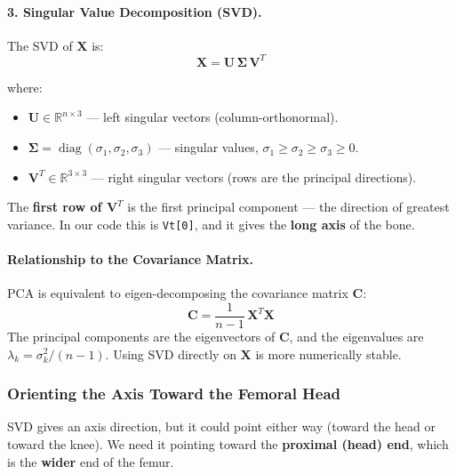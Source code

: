 \documentclass[12pt,a4paper]{article}
\begin{document}
\paragraph{3. Singular Value Decomposition (SVD).}
The SVD of $\mathbf{X}$ is:
\begin{equation}
    \boxed{
        \mathbf{X} = \mathbf{U} \, \boldsymbol{\Sigma} \, \mathbf{V}^T
    }
    \label{eq:svd}
\end{equation}

where:
\begin{itemize}
    \item $\mathbf{U} \in \mathbb{R}^{n \times 3}$ — left singular vectors
          (column-orthonormal).
    \item $\boldsymbol{\Sigma} = \operatorname{diag}(\sigma_1, \sigma_2, \sigma_3)$
          — singular values, $\sigma_1 \geq \sigma_2 \geq \sigma_3 \geq 0$.
    \item $\mathbf{V}^T \in \mathbb{R}^{3 \times 3}$ — right singular vectors
          (rows are the principal directions).
\end{itemize}

The \textbf{first row of $\mathbf{V}^T$} is the first principal component —
the direction of greatest variance.  In our code this is \texttt{Vt[0]}, and
it gives the \textbf{long axis} of the bone.

\paragraph{Relationship to the Covariance Matrix.}
PCA is equivalent to eigen-decomposing the covariance matrix $\mathbf{C}$:
\begin{equation}
    \mathbf{C} = \frac{1}{n-1}\,\mathbf{X}^T \mathbf{X}
\end{equation}
The principal components are the eigenvectors of $\mathbf{C}$, and the
eigenvalues are $\lambda_k = \sigma_k^2 / (n-1)$.  Using SVD directly on
$\mathbf{X}$ is more numerically stable.

\subsubsection{Orienting the Axis Toward the Femoral Head}
\label{sec:orient}

SVD gives an axis direction, but it could point either way (toward the head or
toward the knee).  We need it pointing toward the \textbf{proximal (head) end},
which is the \textbf{wider} end of the femur.
\end{document}
